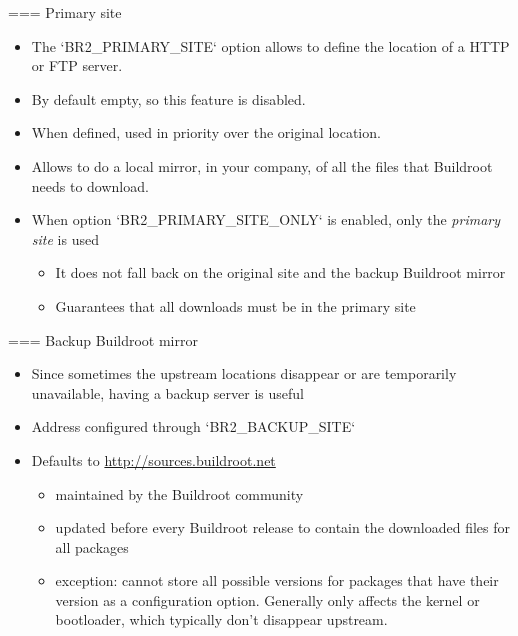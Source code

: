 === {Primary site}
  \begin{itemize}
  \item The `BR2_PRIMARY_SITE` option allows to define the
    location of a HTTP or FTP server.
  \item By default empty, so this feature is disabled.
  \item When defined, used in priority over the original location.
  \item Allows to do a local mirror, in your company, of all the files
    that Buildroot needs to download.
  \item When option `BR2_PRIMARY_SITE_ONLY` is enabled, only the
    {\em primary site} is used
    \begin{itemize}
    \item It does not fall back on the original site and the backup
      Buildroot mirror
    \item Guarantees that all downloads must be in the primary site
    \end{itemize}
  \end{itemize}


=== {Backup Buildroot mirror}
  \begin{itemize}
  \item Since sometimes the upstream locations disappear or are
    temporarily unavailable, having a backup server is useful
  \item Address configured through `BR2_BACKUP_SITE`
  \item Defaults to \url{http://sources.buildroot.net}
    \begin{itemize}
    \item maintained by the Buildroot community
    \item updated before every Buildroot release to contain the
      downloaded files for all packages
    \item exception: cannot store all possible versions for packages
      that have their version as a configuration option. Generally
      only affects the kernel or bootloader, which typically don't
      disappear upstream.
    \end{itemize}
  \end{itemize}


